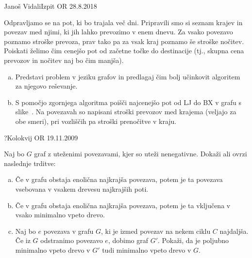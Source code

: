 \begin{naloga}{Janoš Vidali}{Izpit OR 28.8.2018}
\begin{vprasanje}[pot]
Odpravljamo se na pot, ki bo trajala več dni.
Pripravili smo si seznam krajev in povezav med njimi,
ki jih lahko prevozimo v enem dnevu.
Za vsako povezavo poznamo stroške prevoza,
prav tako pa za vsak kraj poznamo še stroške nočitev.
Poiskati želimo čim cenejšo pot od začetne točke do destinacije
(tj., skupna cena prevozov in nočitev naj bo čim manjša).

\begin{enumerate}[(a)]
\item Predstavi problem v jeziku grafov
in predlagaj čim bolj učinkovit algoritem za njegovo reševanje.

\item S pomočjo zgornjega algoritma poišči najcenejšo pot od LJ do BX
v grafu s slike~.
Na povezavah so napisani stroški prevozov med krajema
(veljajo za obe smeri),
pri vozliščih pa stroški prenočitve v kraju.
\end{enumerate}
\end{vprasanje}
\begin{odgovor}
\end{odgovor}
\end{naloga}


\begin{naloga}{?}{Kolokvij OR 19.11.2009}
\begin{vprasanje}[trditve]
Naj bo $G$ graf z uteženimi povezavami, kjer so uteži nenegativne.
Dokaži ali ovrzi naslednje trditve:
\begin{enumerate}[(a)]
\item Če v grafu obstaja enolična najkrajša povezava,
potem je ta povezava vsebovana v vsakem drevesu najkrajših poti.
\item Če v grafu obstaja enolična najkrajša povezava,
potem je ta vključena v vsako minimalno vpeto drevo.
\item Naj bo $e$ povezava v grafu $G$,
ki je izmed povezav na nekem ciklu $C$ najdaljša.
Če iz $G$ odstranimo povezavo $e$, dobimo graf $G'$.
Pokaži, da je poljubno minimalno vpeto drevo v $G'$
tudi minimalno vpeto drevo v $G$.
\end{enumerate}
\end{vprasanje}
\begin{odgovor}
\end{odgovor}
\end{naloga}



